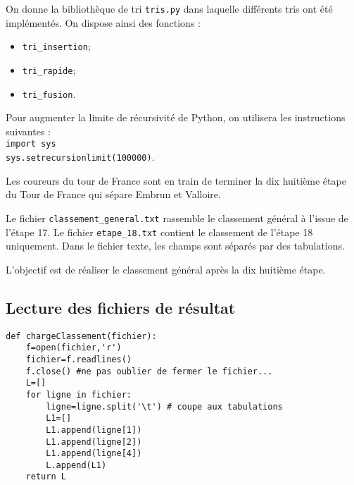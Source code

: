 

On donne la bibliothèque de tri \texttt{tris.py} dans laquelle différents tris ont été implémentés.
On dispose ainsi des fonctions : 
\begin{itemize}
\item \texttt{tri\_insertion};
\item \texttt{tri\_rapide};
\item \texttt{tri\_fusion}.
\end{itemize}

\vspace{0.5cm}

Pour augmenter la limite de récursivité de Python, on utilisera les instructions suivantes :\\
\texttt{import sys}\\
\texttt{sys.setrecursionlimit(100000)}.




Les coureurs du tour de France sont en train de terminer la dix huitième étape du Tour de France qui sépare Embrun et Valloire. 

Le fichier \texttt{classement\_general.txt} rassemble le classement général à l'issue de l'étape 17. Le fichier \texttt{etape\_18.txt} contient le classement de l'étape 18 uniquement. Dans le fichier texte, les champs sont séparés par des tabulations.

\begin{obj}
  L'objectif est de réaliser le classement général après la dix huitième étape.
\end{obj}


\subsection*{Lecture des fichiers de résultat}



\ifprof
\begin{lstlisting}
def chargeClassement(fichier):
    f=open(fichier,'r')
    fichier=f.readlines()
    f.close() #ne pas oublier de fermer le fichier...
    L=[]
    for ligne in fichier:
        ligne=ligne.split('\t') # coupe aux tabulations
        L1=[]
        L1.append(ligne[1])
        L1.append(ligne[2])
        L1.append(ligne[4])
        L.append(L1)
    return L
\end{lstlisting}
\else\fi


